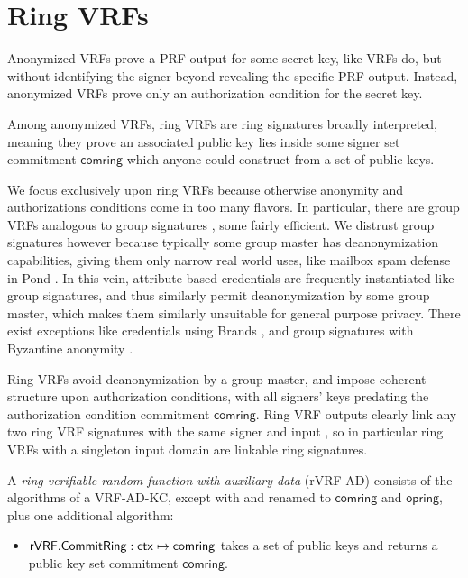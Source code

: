 
\section{Ring VRFs}
\label{sec:rvrf_def}

Anonymized VRFs prove a PRF output for some secret key, like VRFs do,
but without identifying the signer beyond revealing the specific PRF output.
Instead, anonymized VRFs prove only an authorization condition for
the secret key.

\def\comring{\ensuremath{\mathsf{comring}}\xspace}
\def\openring{\ensuremath{\mathsf{opring}}\xspace}
\newcommand{\CommitRing}{\primalgo{CommitRing}}
\newcommand{\OpenRing}{\primalgo{OpenRing}}

Among anonymized VRFs, ring VRFs are ring signatures broadly interpreted,
meaning they prove an associated public key lies inside some signer set
commitment \comring which anyone could construct from a set of public keys.

We focus exclusively upon ring VRFs because otherwise anonymity and
authorizations conditions come in too many flavors.
In particular, there are group VRFs analogous to group signatures
 \cite{group_sig_survey}, some fairly efficient.
%
We distrust group signatures however because typically some group master
has deanonymization capabilities, giving them only narrow real world uses,
like mailbox spam defense in Pond \cite{pond}.
%
In this vein, attribute based credentials are frequently instantiated
like group signatures, and thus similarly permit deanonymization by some
group master, which makes them similarly unsuitable for general purpose
privacy.
%
There exist exceptions like credentials using Brands \cite{brands}, and
group signatures with Byzantine anonymity \cite{cryptoeprint:2021:181}.

Ring VRFs avoid deanonymization by a group master, and impose coherent
structure upon authorization conditions, with all signers' keys
predating the authorization condition commitment \comring. 
%
Ring VRF outputs clearly link any two ring VRF signatures with
the same signer and input \msg, so in particular
 ring VRFs with a singleton input domain are linkable ring signatures.

\smallskip

A {\em ring verifiable random function with auxiliary data} (rVRF-AD)
consists of the algorithms of a VRF-AD-KC, except with
 \compk and \openpk renamed to \comring and \openring,
 plus one additional algorithm:
\begin{itemize}
\item $\rVRF.\CommitRing : \ctx \mapsto \comring$ takes a set \ctx of
 public keys and returns a public key set commitment \comring.
\end{itemize}


